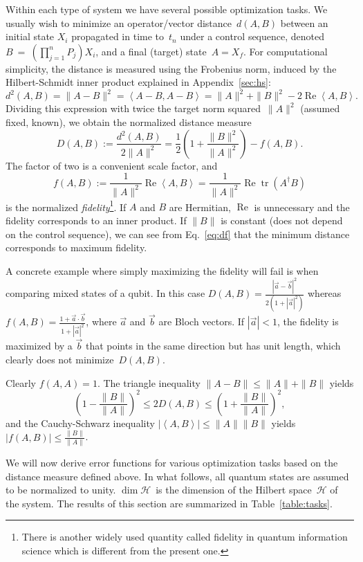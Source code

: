 \documentclass[aps, pra, a4paper, longbibliography, superscriptaddress]{revtex4-1}
\newcommand{\be}{\begin{equation}}
\newcommand{\ee}{\end{equation}}
\newcommand{\inprod}[2]{\left\langle #1, #2 \right\rangle}
\newcommand{\hilb}[1]{\mathcal{#1}}
\DeclareMathOperator{\tr}{tr}
\DeclareMathOperator{\re}{Re}
\begin{document}
Within each type of system we have several possible optimization tasks.
We usually wish to minimize an operator/vector distance~$d(A,B)$ between an
initial state $X_i$ propagated in time to~$t_n$ under a control sequence,
denoted~$B~=~\left(\prod_{j=1}^{n} P_j\right) X_i$,
and a final (target) state~$A = X_f$.
For computational simplicity, the distance is measured using the Frobenius
norm, induced by the Hilbert-Schmidt inner product explained in
Appendix~\ref{sec:hs}:
\be
d^2(A, B) = \|A-B\|^2
= \inprod{A-B}{A-B}
= \|A\|^2 +\|B\|^2 -2 \re \inprod{A}{B}.
\ee
Dividing this expression with twice the target norm squared~$\|A\|^2$ (assumed fixed,
known), we obtain the normalized distance measure
\be
\label{eq:df}
D(A,B)
:= \frac{d^2(A, B)}{2\|A\|^2}
= \frac{1}{2}\left(1 +\frac{\|B\|^2}{\|A\|^2}\right) -f(A, B).
\ee
The factor of two is a convenient scale factor, and
\be
f(A, B)
:= \frac{1}{\|A\|^2} \re \inprod{A}{B}
= \frac{1}{\|A\|^2} \re \tr(A^\dagger B)
\ee
is the normalized \emph{fidelity}\footnote{
There is another widely used quantity called fidelity in quantum information science which is different from the present one.}.
If $A$ and $B$ are Hermitian, $\re$ is unnecessary and the fidelity corresponds to an inner product.
If $\|B\|$ is constant (does not depend on the control sequence), we can see from Eq.~\eqref{eq:df} that
the minimum distance corresponds to maximum fidelity.

A concrete example where simply maximizing the fidelity will fail is when comparing mixed states of a qubit.
In this case $D(A,B) = \frac{|\vec{a}-\vec{b}|^2}{2(1+|\vec{a}|^2)}$
whereas $f(A,B) = \frac{1+\vec{a}\cdot\vec{b}}{1+|\vec{a}|^2}$, where
$\vec{a}$ and $\vec{b}$ are Bloch vectors. If $|\vec{a}| < 1$, the
fidelity is maximized by a $\vec{b}$ that points in the same direction
but has unit length, which clearly does not minimize~$D(A,B)$.


Clearly $f(A, A) = 1$.
The triangle inequality $\|A-B\| \le \|A\|+\|B\|$ yields
\be
\left(1 -\frac{\|B\|}{\|A\|} \right)^2 \le 2D(A, B) \le \left(1 +\frac{\|B\|}{\|A\|} \right)^2,
\ee
and the Cauchy-Schwarz inequality $|\inprod{A}{B}| \le \|A\|\|B\|$
yields
$|f(A, B)|
\le \frac{\|B\|}{\|A\|}$.


We will now derive error functions for various optimization tasks
based on the distance measure defined above.
In what follows, all quantum states are assumed to be normalized to
unity. $\dim \hilb{H}$~is the dimension of the Hilbert space~$\hilb{H}$ of the system.
The results of this section are summarized in Table~\ref{table:tasks}.
\end{document}
